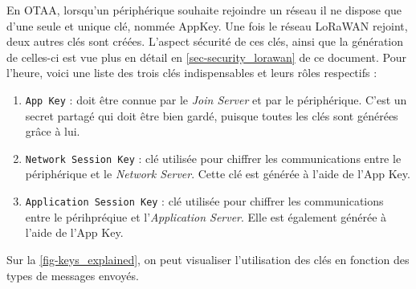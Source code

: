 En OTAA, lorsqu'un périphérique souhaite rejoindre un réseau il ne dispose que d'une seule et unique clé, nommée AppKey. Une fois le réseau LoRaWAN rejoint, deux autres clés sont créées. L'aspect sécurité de ces clés, ainsi que la génération de celles-ci est vue plus en détail en \cref{sec-security_lorawan} de ce document. Pour l'heure, voici une liste des trois clés indispensables et leurs rôles respectifs : 
\begin{enumerate}
    \item \texttt{App Key} : doit être connue par le \textit{Join Server} et par le périphérique. C'est un secret partagé qui doit être bien gardé, puisque toutes les clés sont générées grâce à lui.
    \item \texttt{Network Session Key} : clé utilisée pour chiffrer les communications entre le périphérique et le \textit{Network Server}. Cette clé est générée à l'aide de l'App Key.
    \item \texttt{Application Session Key} : clé utilisée pour chiffrer les communications entre le périhpréqiue et l'\textit{Application Server}. Elle est également générée à l'aide de l'App Key.
\end{enumerate}

Sur la \cref{fig-keys_explained}, on peut visualiser l'utilisation des clés en fonction des types de messages envoyés.






